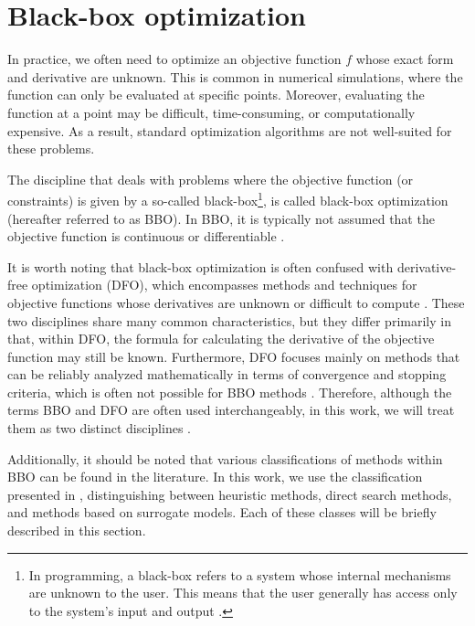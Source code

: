 \section{Black-box optimization}\label{black-box}
In practice, we often need to optimize an objective function $f$ whose exact form and derivative are unknown. This is common in numerical simulations, where the function can only be evaluated at specific points. Moreover, evaluating the function at a point may be difficult, time-consuming, or computationally expensive. As a result, standard optimization algorithms are not well-suited for these problems.

The discipline that deals with problems where the objective function (or constraints) is given by a so-called black-box\footnote{In programming, a black-box refers to a system whose internal mechanisms are unknown to the user. This means that the user generally has access only to the system’s input and output \cite{BBO-textbook}.}, is called black-box optimization (hereafter referred to as BBO). In BBO, it is typically not assumed that the objective function is continuous or differentiable \cite{BBO-textbook, derivative-free-review, two-decades}.

It is worth noting that black-box optimization is often confused with derivative-free optimization (DFO), which encompasses methods and techniques for objective functions whose derivatives are unknown or difficult to compute \cite{BBO-textbook, derivative-free-review, Kramer2011}. These two disciplines share many common characteristics, but they differ primarily in that, within DFO, the formula for calculating the derivative of the objective function may still be known. Furthermore, DFO focuses mainly on methods that can be reliably analyzed mathematically in terms of convergence and stopping criteria, which is often not possible for BBO methods \cite{BBO-textbook}. Therefore, although the terms BBO and DFO are often used interchangeably, in this work, we will treat them as two distinct disciplines \cite{BBO-textbook}.

Additionally, it should be noted that various classifications of methods within BBO can be found in the literature. In this work, we use the classification presented in \cite{BBO-textbook}, distinguishing between heuristic methods, direct search methods, and methods based on surrogate models. Each of these classes will be briefly described in this section.




